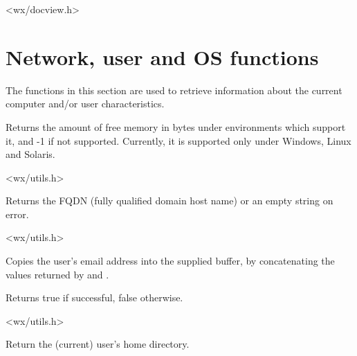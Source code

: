 <wx/docview.h>



\section{Network, user and OS functions}\label{networkfunctions}

The functions in this section are used to retrieve information about the
current computer and/or user characteristics.


\label{wxgetfreememory}


Returns the amount of free memory in bytes under environments which
support it, and -1 if not supported. Currently, it is supported only
under Windows, Linux and Solaris.


<wx/utils.h>


\label{wxgetfullhostname}


Returns the FQDN (fully qualified domain host name) or an empty string on
error.




<wx/utils.h>


\label{wxgetemailaddress}


Copies the user's email address into the supplied buffer, by
concatenating the values returned by \rtfsp
and .

Returns true if successful, false otherwise.


<wx/utils.h>


\label{wxgethomedir}


Return the (current) user's home directory.



